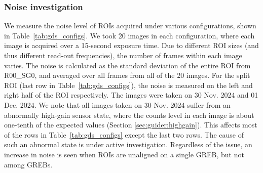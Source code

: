 \subsubsection{Noise investigation}
We measure the noise level of ROIs acquired under various configurations, shown in Table~\ref{tab:gds_configs}. We took 20 images in each configuration, where each image is acquired over a 15-second exposure time. Due to different ROI sizes (and thus different read-out frequencies), the number of frames within each image varies.  The noise is calculated as the standard deviation of the entire ROI from R00\_SG0, and averaged over all frames from all of the 20 images. For the split ROI (last row in Table~\ref{tab:gds_configs}), the noise is measured on the left and right half of the ROI respectively. The images were taken on 30 Nov. 2024 and 01 Dec. 2024. We note that all images taken on 30 Nov. 2024 suffer from an abnormally high-gain sensor state, where the counts level in each image is about one-tenth of the expected values (Section \ref{sec:guider:highgain}). This affects most of the rows in Table~\ref{tab:gds_configs} except the last two rows. The cause of such an abnormal state is under active investigation. Regardless of the issue, an increase in noise is seen when ROIs are unaligned on a single GREB, but not among GREBs.

